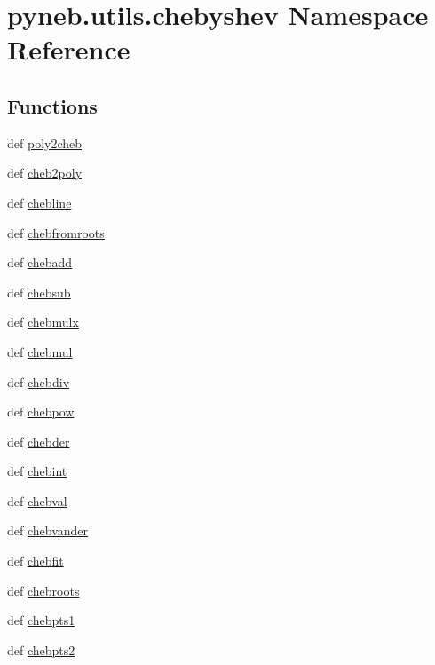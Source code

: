 \hypertarget{namespacepyneb_1_1utils_1_1chebyshev}{\section{pyneb.\-utils.\-chebyshev Namespace Reference}
\label{namespacepyneb_1_1utils_1_1chebyshev}
}
\subsection*{Functions}
\begin{DoxyCompactItemize}
\item 
def \hyperlink{namespacepyneb_1_1utils_1_1chebyshev_abd824b0c3e5e2cc0f9464a0986dc3819}{poly2cheb}
\item 
def \hyperlink{namespacepyneb_1_1utils_1_1chebyshev_a0e43853c4c6b0f440005cc6b5124557e}{cheb2poly}
\item 
def \hyperlink{namespacepyneb_1_1utils_1_1chebyshev_ab88a5c9a7faa4458231ddb2edc1aa860}{chebline}
\item 
def \hyperlink{namespacepyneb_1_1utils_1_1chebyshev_ad3dc62fdecc545593e36509daa1c2632}{chebfromroots}
\item 
def \hyperlink{namespacepyneb_1_1utils_1_1chebyshev_aafceea7ad9a5a18707fcf493bcf70457}{chebadd}
\item 
def \hyperlink{namespacepyneb_1_1utils_1_1chebyshev_a2ca3ca3bac02e30625edb4c48ada7ddf}{chebsub}
\item 
def \hyperlink{namespacepyneb_1_1utils_1_1chebyshev_a91d78fa31041dfe9ccf7bbc0891809b3}{chebmulx}
\item 
def \hyperlink{namespacepyneb_1_1utils_1_1chebyshev_a20beb101adf242958f21dff04591e1ca}{chebmul}
\item 
def \hyperlink{namespacepyneb_1_1utils_1_1chebyshev_a5d4faaef412d6dfe502716e8e287d727}{chebdiv}
\item 
def \hyperlink{namespacepyneb_1_1utils_1_1chebyshev_ab647ff3aa7750a09b934b98cddd4c90d}{chebpow}
\item 
def \hyperlink{namespacepyneb_1_1utils_1_1chebyshev_a1ed2b9248c247449584904025ec9d460}{chebder}
\item 
def \hyperlink{namespacepyneb_1_1utils_1_1chebyshev_a233e686a07b9935c74ce1e053f0c5f5f}{chebint}
\item 
def \hyperlink{namespacepyneb_1_1utils_1_1chebyshev_a44ae40c5b4cbdc3a230c014c834f5ce6}{chebval}
\item 
def \hyperlink{namespacepyneb_1_1utils_1_1chebyshev_a4a53ad781fcf149c5ab6ae5d021b0950}{chebvander}
\item 
def \hyperlink{namespacepyneb_1_1utils_1_1chebyshev_a6bb5eb95525fd0572aea52fcd2a12c6c}{chebfit}
\item 
def \hyperlink{namespacepyneb_1_1utils_1_1chebyshev_a63ef136648aeceebc5b0a0cfce98d49a}{chebroots}
\item 
def \hyperlink{namespacepyneb_1_1utils_1_1chebyshev_aa5e7d5d318e547f5df15b55224524753}{chebpts1}
\item 
def \hyperlink{namespacepyneb_1_1utils_1_1chebyshev_a375236ee9f8b4a3f0d7d099af19e7818}{chebpts2}
\end{DoxyCompactItemize}
